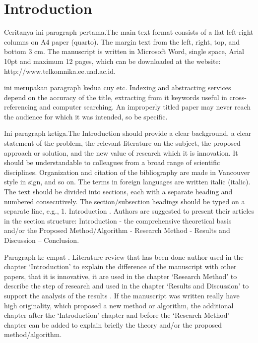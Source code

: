 \section{Introduction}
\label{Introduction}
Ceritanya ini paragraph pertama\citep{awangga2018ontology}.The main text format consists of a flat left-right columns on A4 paper (quarto)\citep{armiati2018national}. The margin text from the left, right, top, and bottom 3 cm\citep{setyawan2018comparison}. The manuscript is written in Microsoft Word\citep{pane2018analysis}, single space, Arial 10pt and maximum 12 pages\citep{awangga2019implementation}, which can be downloaded at the website: http://www.telkomnika.ee.uad.ac.id\citep{awangga2017colenak}.

ini merupakan paragraph kedua cuy etc\citep{awangga2019kafa}. Indexing and abstracting services depend on the accuracy of the title\citep{awangga2019ontology}, extracting from it keywords useful in cross-referencing and computer searching\citep{maulani2018analysis}. An improperly titled paper may never reach the audience for which it was intended\citep{harani2018improving}, so be specific\citep{awangga2018k}.

Ini paragraph ketiga\citep{yulita2018feature}.The Introduction should provide a clear background\citep{pane2019rfid}, a clear statement of the problem, the relevant literature on the subject, the proposed approach or solution, and the new value of research which it is innovation. It should be understandable to colleagues from a broad range of scientific disciplines. Organization and citation of the bibliography are made in Vancouver style in sign, and so on. The terms in foreign languages are written italic (italic)\citep{awangga2018sampeu}. The text should be divided into sections, each with a separate heading and numbered consecutively. The section/subsection headings should be typed on a separate line, e.g., 1. Introduction . Authors are suggested to present their articles in the section structure: Introduction - the comprehensive theoretical basis and/or the Proposed Method/Algorithm - Research Method - Results and Discussion – Conclusion\citep{pane2018qualitative}.

Paragraph ke empat . Literature review that has been done author used in the chapter `Introduction' to explain the difference of the manuscript with other papers, that it is innovative, it are used in the chapter `Research Method' to describe the step of research and used in the chapter `Results and Discussion' to support the analysis of the results . If the manuscript was written really have high originality, which proposed a new method or algorithm, the additional chapter after the `Introduction' chapter and before the `Research Method' chapter can be added to explain briefly the theory and/or the proposed method/algorithm\citep{setyawan2018analysis}.